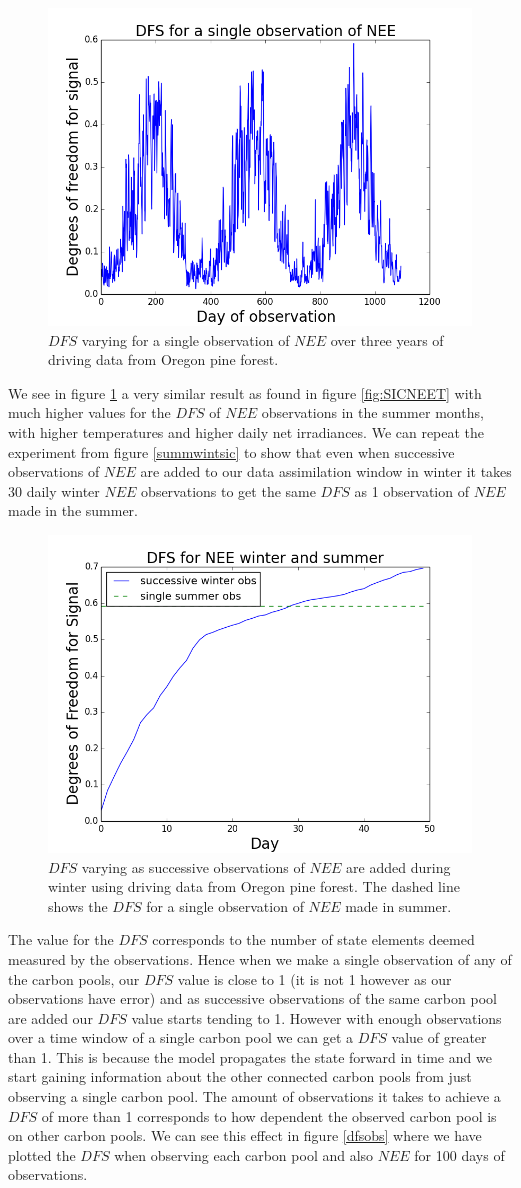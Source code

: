 \documentclass[11pt]{article}
\begin{document}
\begin{figure}[ht]
\centering
\includegraphics[height=.33\textwidth]{DFS1Obs_0_1095.png}
\caption{$DFS$ varying for a single observation of $NEE$ over three years of driving data from Oregon pine forest.}
\label{DFS1nee}
\end{figure}

We see in figure \ref{DFS1nee} a very similar result as found in figure \ref{fig:SICNEET} with much higher values for the $DFS$ of $NEE$ observations in the summer months, with higher temperatures and higher daily net irradiances. We can repeat the experiment from figure \ref{summwintsic} to show that even when successive observations of $NEE$ are added to our data assimilation window in winter it takes 30 daily winter $NEE$ observations to get the same $DFS$ as 1 observation of $NEE$ made in the summer.

\begin{figure}[ht]
\centering
\includegraphics[height=.34\textwidth]{succwinter_singlesummerdofs.png}
\caption{$DFS$ varying as successive observations of $NEE$ are added during winter using driving data from Oregon pine forest. The dashed line shows the $DFS$ for a single observation of $NEE$ made in summer.}
\label{fig:SIC_subplot}
\end{figure}

The value for the $DFS$ corresponds to the number of state elements deemed measured by the observations. Hence when we make a single observation of any of the carbon pools, our $DFS$ value is close to 1 (it is not 1 however as our observations have error) and as successive observations of the same carbon pool are added our $DFS$ value starts tending to 1. However with enough observations over a time window of a single carbon pool we can get a $DFS$ value of greater than 1. This is because the model propagates the state forward in time and we start gaining information about the other connected carbon pools from just observing a single carbon pool. The amount of observations it takes to achieve a $DFS$ of more than 1 corresponds to how dependent the observed carbon pool is on other carbon pools. We can see this effect in figure \ref{dfsobs} where we have plotted the $DFS$ when observing each carbon pool and also $NEE$ for 100 days of observations.
\end{document}
